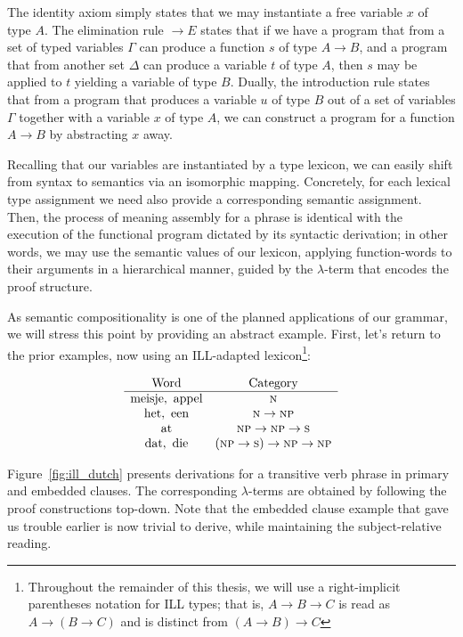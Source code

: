 The identity axiom simply states that we may instantiate a free variable $x$ of type $A$.
The elimination rule $\rightarrow E$ states that if we have a program that from a set of typed variables $\Gamma$ can produce a function $s$ of type $A \to B$, and a program that from another set $\Delta$ can produce a variable $t$ of type $A$, then $s$ may be applied to $t$ yielding a variable of type $B$.
Dually, the introduction rule states that from a program that produces a variable $u$ of type $B$ out of a set of variables $\Gamma$ together with a variable $x$ of type $A$, we can construct a program for a function $A\to B$ by abstracting $x$ away.

Recalling that our variables are instantiated by a type lexicon, we can easily shift from syntax to semantics via an isomorphic mapping.
Concretely, for each lexical type assignment we need also provide a corresponding semantic assignment.
Then, the process of meaning assembly for a phrase is identical with the execution of the functional program dictated by its syntactic derivation; in other words, we may use the semantic values of our lexicon, applying function-words to their arguments in a hierarchical manner, guided by the $\lambda$-term that encodes the proof structure.

As semantic compositionality is one of the planned applications of our grammar, we will stress this point by providing an abstract example.
First, let's return to the prior examples, now using an ILL-adapted lexicon\footnote{Throughout the remainder of this thesis, we will use a right-implicit parentheses notation for ILL types; that is, $A\to B \to C$ is read as $A\to (B \to C)$ and is distinct from $(A\to B) \to C$}:

 \[
 \begin{array}{cc}
 \text{Word} & \text{Category} \\
 \hline
 \text{meisje}, \ \text{appel} & \textsc{n} \\
 \text{het}, \ \text{een}  & \textsc{n} \to \textsc{np}\\
 \text{at}  & \textsc{np} \to \textsc{np} \to \textsc{s}\\ 
 \text{dat}, \ \text{die} & (\textsc{np}\to \textsc{s})\to \textsc{np} \to \textsc{np} \\
 \end{array}
 \]

Figure~\ref{fig:ill_dutch} presents derivations for a transitive verb phrase in primary and embedded clauses.
The corresponding $\lambda$-terms are obtained by following the proof constructions top-down.
Note that the embedded clause example that gave us trouble earlier is now trivial to derive, while maintaining the subject-relative reading.

